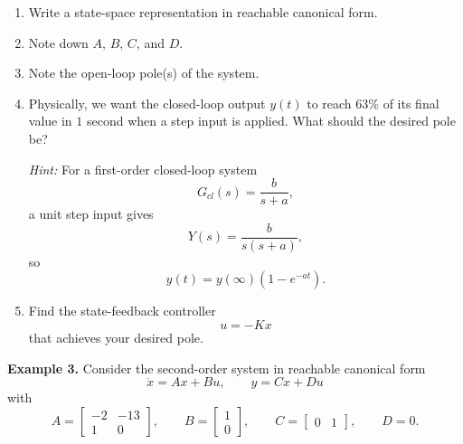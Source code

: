 \documentclass{ee122_notes}
\begin{document}
\begin{enumerate}[label=\textbf{Task \arabic*.}, leftmargin=*]

\item Write a state-space representation in reachable canonical form.

\vspace{2.4cm}

\item Note down \(A\), \(B\), \(C\), and \(D\).

\vspace{0.8cm}

\item Note the open-loop pole(s) of the system.

\vspace{0.8cm}

\item Physically, we want the closed-loop output \(y(t)\) to reach \(63\%\) of its final value in \(1\) second when a step input is applied. What should the desired pole be?

\textit{Hint:} For a first-order closed-loop system
\[
G_{cl}(s)=\frac{b}{s+a},
\]
a unit step input gives
\[
Y(s)=\frac{b}{s(s+a)},
\]
so
\[
y(t)=y(\infty)\left(1-e^{-at}\right).
\]

\vspace{2.3cm}

\item Find the state-feedback controller
\[
u=-Kx
\]
that achieves your desired pole.

\vspace{1.8cm}

\end{enumerate}


\textbf{Example 3.} Consider the second-order system in reachable canonical form
\[
\dot{x}=Ax+Bu,\qquad y=Cx+Du
\]
with
\[
A=\begin{bmatrix}
-2 & -13\\
1 & 0
\end{bmatrix},
\qquad
B=\begin{bmatrix}
1\\
0
\end{bmatrix},
\qquad
C=\begin{bmatrix}
0 & 1
\end{bmatrix},
\qquad
D=0.
\]
\end{document}
